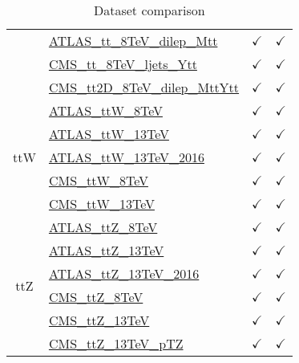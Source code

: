 \documentclass{article}
\begin{document}
\begin{table}[H]
\begin{tabular}{|c|l|c|c|}
 & \href{https://arxiv.org/abs/1607.07281}{ATLAS_tt_8TeV_dilep_Mtt}  & $\checkmark$ & $\checkmark$\\ \cline{2-4}
 & \href{https://arxiv.org/abs/1505.04480}{CMS_tt_8TeV_ljets_Ytt}  & $\checkmark$ & $\checkmark$\\ \cline{2-4}
 & \href{https://arxiv.org/abs/1703.01630}{CMS_tt2D_8TeV_dilep_MttYtt}  & $\checkmark$ & $\checkmark$
\\ \hline
\multirow{5}{*}{ttW}
 & \href{https://arxiv.org/abs/1509.05276}{ATLAS_ttW_8TeV}  & $\checkmark$ & $\checkmark$\\ \cline{2-4}
 & \href{https://arxiv.org/abs/1609.01599}{ATLAS_ttW_13TeV}  & $\checkmark$ & $\checkmark$\\ \cline{2-4}
 & \href{https://arxiv.org/abs/1901.03584}{ATLAS_ttW_13TeV_2016}  & $\checkmark$ & $\checkmark$\\ \cline{2-4}
 & \href{https://arxiv.org/abs/1510.01131}{CMS_ttW_8TeV}  & $\checkmark$ & $\checkmark$\\ \cline{2-4}
 & \href{https://arxiv.org/abs/1711.02547}{CMS_ttW_13TeV}  & $\checkmark$ & $\checkmark$
\\ \hline
\multirow{6}{*}{ttZ}
 & \href{https://arxiv.org/abs/1509.05276}{ATLAS_ttZ_8TeV}  & $\checkmark$ & $\checkmark$\\ \cline{2-4}
 & \href{https://arxiv.org/abs/1609.01599}{ATLAS_ttZ_13TeV}  & $\checkmark$ & $\checkmark$\\ \cline{2-4}
 & \href{https://arxiv.org/abs/1901.03584}{ATLAS_ttZ_13TeV_2016}  & $\checkmark$ & $\checkmark$\\ \cline{2-4}
 & \href{https://arxiv.org/abs/1510.01131}{CMS_ttZ_8TeV}  & $\checkmark$ & $\checkmark$\\ \cline{2-4}
 & \href{https://arxiv.org/abs/1711.02547}{CMS_ttZ_13TeV}  & $\checkmark$ & $\checkmark$\\ \cline{2-4}
 & \href{https://arxiv.org/abs/1907.11270}{CMS_ttZ_13TeV_pTZ}  & $\checkmark$ & $\checkmark$
\\ \hline
\end{tabular}
\caption{Dataset comparison}
\end{table}
\end{document}
